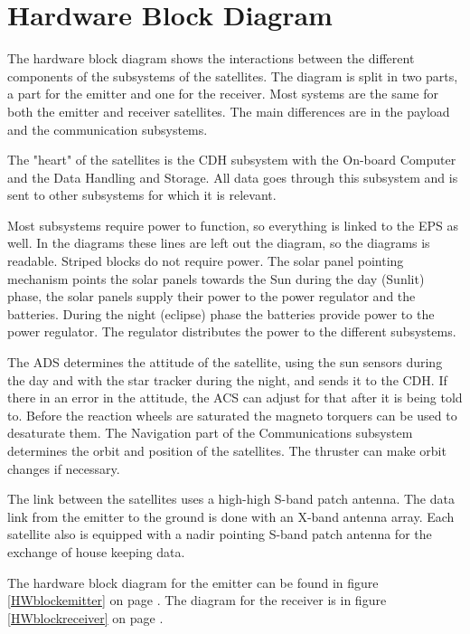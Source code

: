 \section{Hardware Block Diagram}
The hardware block diagram shows the interactions between the different components of the subsystems of the satellites. The diagram is split in two parts, a part for the emitter and one for the receiver. Most systems are the same for both the emitter and receiver satellites. The main differences are in the payload and the communication subsystems.

The "heart" of the satellites is the \ac{CDH} subsystem with the On-board Computer and the Data Handling and Storage. All data goes through this subsystem and is sent to other subsystems for which it is relevant. 

Most subsystems require power to function, so everything is linked to the \ac{EPS} as well. In the diagrams these lines are left out the diagram, so the diagrams is readable. Striped blocks do not require power. The solar panel pointing mechanism points the solar panels towards the Sun during the day (Sunlit) phase, the solar panels supply their power to the power regulator and the batteries. During the night (eclipse) phase the batteries provide power to the power regulator. The regulator distributes the power to the different subsystems.

The \ac{ADS} determines the attitude of the satellite, using the sun sensors during the day and with the star tracker during the night, and sends it to the \ac{CDH}. If there in an error in the attitude, the \ac{ACS} can adjust for that after it is being told to. Before the reaction wheels are saturated the magneto torquers can be used to desaturate them. The Navigation part of the Communications subsystem determines the orbit and position of the satellites. The thruster can make orbit changes if necessary.

The link between the satellites uses a high-high S-band patch antenna. The data link from the emitter to the ground is done with an X-band antenna array. Each satellite also is equipped with a nadir pointing S-band patch antenna for the exchange of house keeping data.

The hardware block diagram for the emitter can be found in figure \ref{HWblockemitter} on page \pageref{HWblockemitter}. The diagram for the receiver is in figure \ref{HWblockreceiver} on page \pageref{HWblockreceiver}.

